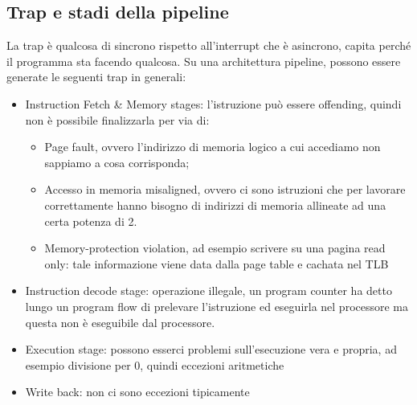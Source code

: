 \documentclass[12pt, oneside]{extbook}
\begin{document}
\subsection{Trap e stadi della pipeline}
La trap è qualcosa di sincrono rispetto all'interrupt che è asincrono, capita perché il programma sta facendo qualcosa. Su una architettura pipeline, possono essere generate le seguenti trap in generali:
\begin{itemize}
\item Instruction Fetch \& Memory stages: l'istruzione può essere offending, quindi non è possibile finalizzarla per via di:
\begin{itemize}
\item Page fault, ovvero l'indirizzo di memoria logico a cui accediamo non sappiamo a cosa corrisponda;
\item Accesso in memoria misaligned, ovvero ci sono istruzioni che per lavorare correttamente hanno bisogno di indirizzi di memoria allineate ad una certa potenza di 2. 
\item Memory-protection violation, ad esempio scrivere su una pagina read only: tale informazione viene data dalla page table e cachata nel TLB
\end{itemize}
\item Instruction decode stage: operazione illegale, un program counter ha detto lungo un program flow di prelevare l'istruzione ed eseguirla nel processore ma questa non è eseguibile dal processore. 
\item Execution stage: possono esserci problemi sull'esecuzione vera e propria, ad esempio divisione per 0, quindi eccezioni aritmetiche
\item Write back: non ci sono eccezioni tipicamente
\end{itemize}
\end{document}

